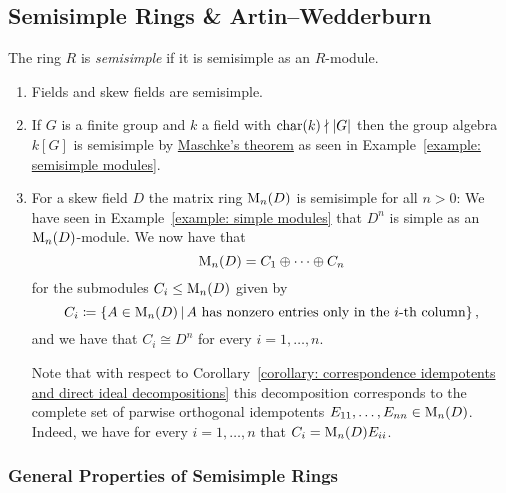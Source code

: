 \subsection{Semisimple Rings \& Artin--Wedderburn}


\begin{definition}
  The ring $R$ is \emph{semisimple} if it is semisimple as an $R$-module.
\end{definition}


\begin{example}
  \label{example: semisimple rings}
  \leavevmode
  \begin{enumerate}
    \item
      Fields and skew fields are semisimple.
    \item
      If $G$ is a finite group and $k$ a field with $\operatorname{char}(k) \nmid |G|$ then the group algebra $k[G]$ is semisimple by \hyperref[theorem: maschkes theorem]{Maschke’s theorem} as seen in Example~\ref{example: semisimple modules}.
    \item
      For a skew field $D$ the matrix ring $\operatorname{M}_n(D)$ is semisimple for all $n > 0$:
      We have seen in Example~\ref{example: simple modules} that $D^n$ is simple as an $\operatorname{M}_n(D)$-module.
      We now have that
      \[
          \operatorname{M}_n(D)
        = C_1 \oplus \dotsb \oplus C_n
      \]
      for the submodules $C_i \leq \operatorname{M}_n(D)$ given by 
      \[
                  C_i
        \defined  \{
                    A \in \Mat_n(D)
                  \suchthat
                    \text{$A$ has nonzero entries only in the $i$-th column}
                  \} \,,
      \]
      and we have that $C_i \cong D^n$ for every $i = 1, \dotsc, n$.
      
      Note that with respect to Corollary~\ref{corollary: correspondence idempotents and direct ideal decompositions} this decomposition corresponds to the complete set of parwise orthogonal idempotents $E_{11}, \dotsc, E_{nn} \in \operatorname{M}_n(D)$.
      Indeed, we have for every $i = 1, \dotsc, n$ that $C_i = \operatorname{M}_n(D) E_{ii}$.
  \end{enumerate}
\end{example}




\subsubsection{General Properties of Semisimple Rings}


